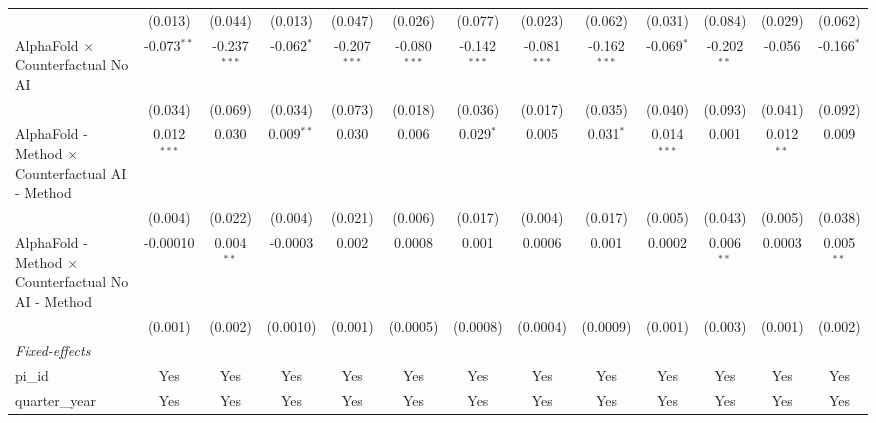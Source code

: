 \begin{tabular}{lcccccccccccc}
                                                              & (0.013)        & (0.044)        & (0.013)        & (0.047)        & (0.026)        & (0.077)        & (0.023)        & (0.062)        & (0.031)        & (0.084)        & (0.029)        & (0.062)\\   
   AlphaFold $\times$ Counterfactual No AI                    & -0.073$^{**}$  & -0.237$^{***}$ & -0.062$^{*}$   & -0.207$^{***}$ & -0.080$^{***}$ & -0.142$^{***}$ & -0.081$^{***}$ & -0.162$^{***}$ & -0.069$^{*}$   & -0.202$^{**}$  & -0.056         & -0.166$^{*}$\\   
                                                              & (0.034)        & (0.069)        & (0.034)        & (0.073)        & (0.018)        & (0.036)        & (0.017)        & (0.035)        & (0.040)        & (0.093)        & (0.041)        & (0.092)\\   
   AlphaFold - Method $\times$ Counterfactual AI - Method     & 0.012$^{***}$  & 0.030          & 0.009$^{**}$   & 0.030          & 0.006          & 0.029$^{*}$    & 0.005          & 0.031$^{*}$    & 0.014$^{***}$  & 0.001          & 0.012$^{**}$   & 0.009\\   
                                                              & (0.004)        & (0.022)        & (0.004)        & (0.021)        & (0.006)        & (0.017)        & (0.004)        & (0.017)        & (0.005)        & (0.043)        & (0.005)        & (0.038)\\   
   AlphaFold - Method $\times$ Counterfactual No AI - Method  & -0.00010       & 0.004$^{**}$   & -0.0003        & 0.002          & 0.0008         & 0.001          & 0.0006         & 0.001          & 0.0002         & 0.006$^{**}$   & 0.0003         & 0.005$^{**}$\\   
                                                              & (0.001)        & (0.002)        & (0.0010)       & (0.001)        & (0.0005)       & (0.0008)       & (0.0004)       & (0.0009)       & (0.001)        & (0.003)        & (0.001)        & (0.002)\\   
   \midrule
   \emph{Fixed-effects}\\
   pi\_id                                                     & Yes            & Yes            & Yes            & Yes            & Yes            & Yes            & Yes            & Yes            & Yes            & Yes            & Yes            & Yes\\  
   quarter\_year                                              & Yes            & Yes            & Yes            & Yes            & Yes            & Yes            & Yes            & Yes            & Yes            & Yes            & Yes            & Yes\\  

\end{tabular}
